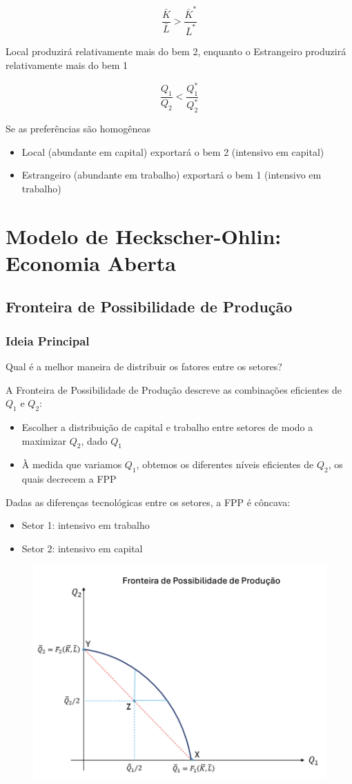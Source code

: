 \documentclass[a4paper,12pt]{article}[abntex2]
\begin{document}
\[
\frac{\bar{K}}{\bar{L}} > \frac{\bar{K}^*}{\bar{L}^*}
\]

Local produzirá relativamente mais do bem 2, enquanto o Estrangeiro produzirá relativamente mais do bem 1

\[
\frac{Q_1}{Q_2} < \frac{Q_1^*}{Q_2^*}
\]

Se as preferências são homogêneas
\begin{itemize}
    \item Local (abundante em capital) exportará o bem 2 (intensivo em capital)
    \item Estrangeiro (abundante em trabalho) exportará o bem 1 (intensivo em trabalho)
\end{itemize}

\newpage
\section{\textbf{Modelo de Heckscher-Ohlin: Economia Aberta}}
\subsection{\textbf{Fronteira de Possibilidade de Produção}}
\subsubsection{\textbf{Ideia Principal}}
Qual é a melhor maneira de distribuir os fatores entre os setores?

A Fronteira de Possibilidade de Produção descreve as combinações eficientes de \( Q_1 \) e \( Q_2 \):
\begin{itemize}
    \item Escolher a distribuição de capital e trabalho entre setores de modo a maximizar \( Q_2 \), dado \( Q_1 \)
    \item À medida que variamos \( Q_1 \), obtemos os diferentes níveis eficientes de \( Q_2 \), os quais decrecem a FPP
\end{itemize}

Dadas as diferenças tecnológicas entre os setores, a FPP é côncava:
\begin{itemize}
    \item Setor 1: intensivo em trabalho
    \item Setor 2: intensivo em capital
\end{itemize}

\begin{figure}[H]
    \centering
    \includegraphics[width=0.7\linewidth]{Imagens/a12i1.png}
\end{figure}
\end{document}

